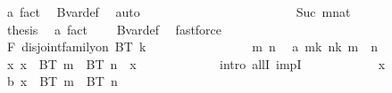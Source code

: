 \begin{isabellebody}
\ a\ fact{}\ \isamarkupfalse%
\ Bvar{\isacharunderscore}{\kern0pt}def\ \isamarkupfalse%
\ auto\isanewline
\ \ \ \ \ \ \ \ \ \ \isamarkupfalse%
\isanewline
\ \ \ \ \ \ \ \ \ \ \ \ \isamarkupfalse%
\ {\isacharparenleft}{\kern0pt}Suc\ mnat{\isacharparenright}{\kern0pt}\isanewline
\ \ \ \ \ \ \ \ \ \ \ \ \isamarkupfalse%
\ \isamarkupfalse%
\ {\isacharquery}{\kern0pt}thesis\ \isamarkupfalse%
\ a\ fact{}\ \ {\isacharasterisk}{\kern0pt}\ \isamarkupfalse%
\ Bvar{\isacharunderscore}{\kern0pt}def\ \isamarkupfalse%
\ fastforce\isanewline
\ \ \ \ \ \ \ \ \ \ \isamarkupfalse%
\isanewline
\ \ \ \ \ \ \ \ \isamarkupfalse%
\isanewline
\ \ \ \ \ \ \isamarkupfalse%
\isanewline
\isanewline
\ \ \ \ \ \ \isamarkupfalse%
\ F{}{\isacharcolon}{\kern0pt}\ {\isachardoublequoteopen}disjoint{\isacharunderscore}{\kern0pt}family{\isacharunderscore}{\kern0pt}on\ BT\ {\isacharbraceleft}{\kern0pt}{\isachardot}{\kern0pt}{\isachardot}{\kern0pt}k{\isacharplus}{\kern0pt}{}{\isacharbraceright}{\kern0pt}{\isachardoublequoteclose}\isanewline
\ \ \ \ \ \ \isamarkupfalse%
\isanewline
\ \ \ \ \ \ \ \ \isamarkupfalse%
\ m\ n\ \isamarkupfalse%
\ a{\isacharcolon}{\kern0pt}\ {\isachardoublequoteopen}m{\isasymin}{\isacharbraceleft}{\kern0pt}{\isachardot}{\kern0pt}{\isachardot}{\kern0pt}k{\isacharplus}{\kern0pt}{}{\isacharbraceright}{\kern0pt}{\isachardoublequoteclose}\ {\isachardoublequoteopen}n{\isasymin}{\isacharbraceleft}{\kern0pt}{\isachardot}{\kern0pt}{\isachardot}{\kern0pt}k{\isacharplus}{\kern0pt}{}{\isacharbraceright}{\kern0pt}{\isachardoublequoteclose}\ {\isachardoublequoteopen}m\ {\isasymnoteq}\ n{\isachardoublequoteclose}\isanewline
\ \ \ \ \ \ \ \ \isamarkupfalse%
\ {\isachardoublequoteopen}{\isasymforall}x{\isachardot}{\kern0pt}\ x\ {\isasymin}\ BT\ m\ {\isasyminter}\ BT\ n\ {\isasymlongrightarrow}\ x\ {\isasymin}\ {\isacharbraceleft}{\kern0pt}{\isacharbraceright}{\kern0pt}{\isachardoublequoteclose}\ \isanewline
\ \ \ \ \ \ \ \ \isamarkupfalse%
\ {\isacharparenleft}{\kern0pt}intro\ allI\ impI{\isacharparenright}{\kern0pt}\isanewline
\ \ \ \ \ \ \ \ \ \ \isamarkupfalse%
\ x\ \isamarkupfalse%
\ b{\isacharcolon}{\kern0pt}\ {\isachardoublequoteopen}x\ {\isasymin}\ BT\ m\ {\isasyminter}\ BT\ n{\isachardoublequoteclose}\isanewline

\end{isabellebody}
